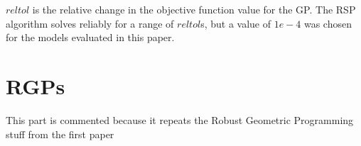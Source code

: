 \documentclass{article}
\renewcommand{\vec}{\mathbf}
\begin{document}
$reltol$ is the relative change in the objective function value for the GP. The RSP algorithm solves reliably for a range of $reltol$s, but a value of $1e-4$ was chosen for the models evaluated in this paper. 


\section{RGPs}
This part is commented because it repeats the Robust Geometric Programming stuff from the first paper

\end{document}
